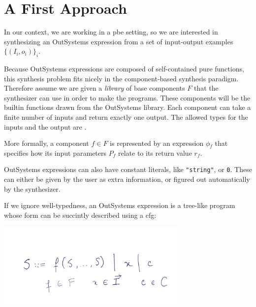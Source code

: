 




\section{A First Approach}
\label{sec:first-approach}

In our context, we are working in a \gls{pbe} setting, so we are interested in
synthesizing an OutSystems expression from a set of input-output examples
$\{(I_i, o_i)\}_i$.

Because OutSystems expressions are composed of self-contained pure functions,
this synthesis problem fits nicely in the component-based synthesis paradigm.
Therefore assume we are given a \textit{library} of base components $F$ that the
synthesizer can use in order to make the programs. These components will be the
builtin functions drawn from the OutSystems library. Each component can take a
finite number of inputs and return exactly one output. The allowed types for the
inputs and the output are .

More formally, a component $f \in F$ is represented by an expression
$\phi{}_f$ that specifies how its input parameters $P_f$ relate to its
return value $r_f$.


OutSystems expressions can also have constant literals, like
\lstinline{"string"}, or \lstinline{0}. These can either be given by the user as
extra information, or figured out automatically by the synthesizer.

If we ignore well-typedness, an OutSystems expression is a tree-like program
whose form can be succintly described using a \gls{cfg}:

\begin{center}
  \includegraphics[width=0.7\textwidth]{assets/cfg-expressions.png}
\end{center}

